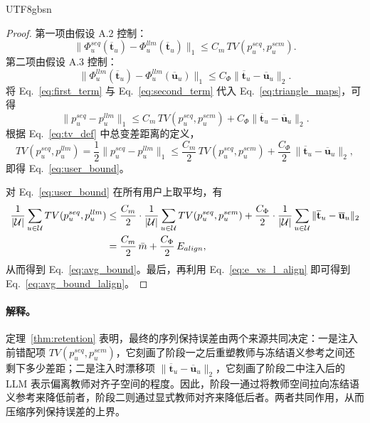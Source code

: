 \documentclass{article}
\begin{document}
\begin{CJK*}{UTF8}{gbsn}
\begin{proof}
第一项由假设 A.2 控制：
\begin{equation}
\|\Phi_u^{seq}(\overline{\mathbf{t}}_u)-\Phi_u^{llm}(\overline{\mathbf{t}}_u)\|_1
\le
C_m\,TV(p_u^{seq},p_u^{sem}).
\label{eq:first_term}
\end{equation}
第二项由假设 A.3 控制：
\begin{equation}
\|\Phi_u^{llm}(\overline{\mathbf{t}}_u)-\Phi_u^{llm}(\overline{\mathbf{u}}_u)\|_1
\le
C_\Phi\|\overline{\mathbf{t}}_u-\overline{\mathbf{u}}_u\|_2.
\label{eq:second_term}
\end{equation}
将 Eq.~\eqref{eq:first_term} 与 Eq.~\eqref{eq:second_term} 代入 Eq.~\eqref{eq:triangle_maps}，可得
\begin{equation}
\|p_u^{seq}-p_u^{llm}\|_1
\le
C_m\,TV(p_u^{seq},p_u^{sem})
+
C_\Phi\|\overline{\mathbf{t}}_u-\overline{\mathbf{u}}_u\|_2.
\label{eq:l1_bound}
\end{equation}
根据 Eq.~\eqref{eq:tv_def} 中总变差距离的定义，
\begin{equation}
TV(p_u^{seq},p_u^{llm})
=
\frac{1}{2}\|p_u^{seq}-p_u^{llm}\|_1
\le
\frac{C_m}{2}\,TV(p_u^{seq},p_u^{sem})
+
\frac{C_\Phi}{2}\,\|\overline{\mathbf{t}}_u-\overline{\mathbf{u}}_u\|_2,
\end{equation}
即得 Eq.~\eqref{eq:user_bound}。

对 Eq.~\eqref{eq:user_bound} 在所有用户上取平均，有
\begin{align}
\frac{1}{|\mathcal U|}\sum_{u\in\mathcal U}TV(p_u^{seq},p_u^{llm})
&\le
\frac{C_m}{2}\cdot
\frac{1}{|\mathcal U|}\sum_{u\in\mathcal U}TV(p_u^{seq},p_u^{sem})
+
\frac{C_\Phi}{2}\cdot
\frac{1}{|\mathcal U|}\sum_{u\in\mathcal U}\|\overline{\mathbf{t}}_u-\overline{\mathbf{u}}_u\|_2 \notag\\
&=
\frac{C_m}{2}\,\bar m+\frac{C_\Phi}{2}\,E_{align},
\end{align}
从而得到 Eq.~\eqref{eq:avg_bound}。最后，再利用 Eq.~\eqref{eq:e_vs_l_align} 即可得到 Eq.~\eqref{eq:avg_bound_lalign}。
\end{proof}

\paragraph{解释。}
定理~\ref{thm:retention} 表明，最终的序列保持误差由两个来源共同决定：一是注入前错配项 $TV(p_u^{seq},p_u^{sem})$，它刻画了阶段一之后重塑教师与冻结语义参考之间还剩下多少差距；二是注入时漂移项 $\|\overline{\mathbf{t}}_u-\overline{\mathbf{u}}_u\|_2$，它刻画了阶段二中注入后的 LLM 表示偏离教师对齐子空间的程度。因此，阶段一通过将教师空间拉向冻结语义参考来降低前者，阶段二则通过显式教师对齐来降低后者。两者共同作用，从而压缩序列保持误差的上界。


\end{CJK*}
\end{document}
